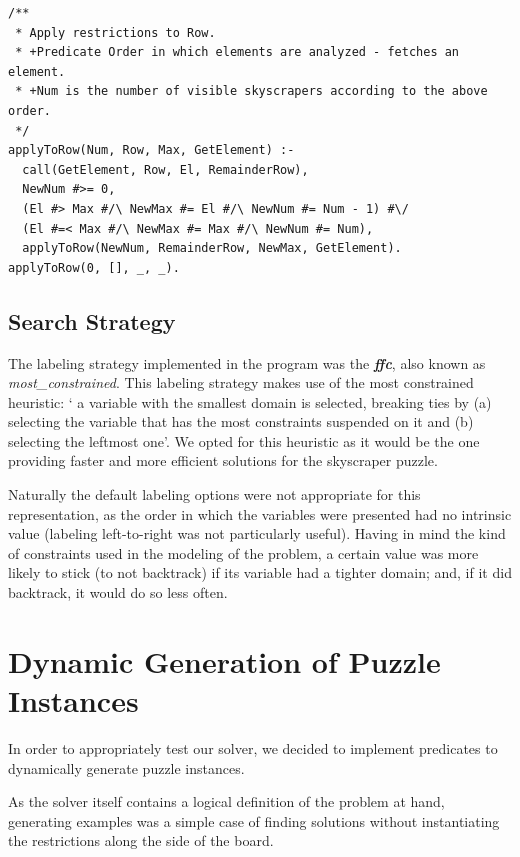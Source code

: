\documentclass{llncs}
\begin{document}
\begin{lstlisting}[frame=tblr, caption=Constraint that assures correct number of visible buildings ]	
/**
 * Apply restrictions to Row.
 * +Predicate Order in which elements are analyzed - fetches an element.
 * +Num is the number of visible skyscrapers according to the above order.
 */
applyToRow(Num, Row, Max, GetElement) :-
  call(GetElement, Row, El, RemainderRow),
  NewNum #>= 0,
  (El #> Max #/\ NewMax #= El #/\ NewNum #= Num - 1) #\/
  (El #=< Max #/\ NewMax #= Max #/\ NewNum #= Num),
  applyToRow(NewNum, RemainderRow, NewMax, GetElement).
applyToRow(0, [], _, _).
\end{lstlisting}

%
\subsection{Search Strategy}

The labeling strategy implemented in the program was the \textbf{\textit{ffc}}, also known as \textit{most\_constrained}. This labeling strategy makes use of the most constrained heuristic: ` a variable with the smallest domain is selected, breaking ties by (a) selecting the variable that has the most constraints suspended on it and (b) selecting the leftmost one'\cite{carlsson_fruhwirth_2016}.  We opted for this heuristic as it would be the one providing faster and more efficient solutions for the skyscraper puzzle.

Naturally the default labeling options were not appropriate for this representation, as the order in which the variables were presented had no intrinsic value (labeling left-to-right was not particularly useful). Having in mind the kind of constraints used in the modeling of the problem, a certain value was more likely to stick (to not backtrack) if its variable had a tighter domain; and, if it did backtrack, it would do so less often.

%
\section{Dynamic Generation of Puzzle Instances}

In order to appropriately test our solver, we decided to implement predicates to dynamically generate puzzle instances.

As the solver itself contains a logical definition of the problem at hand, generating examples was a simple case of finding solutions without instantiating the restrictions along the side of the board.
\end{document}
